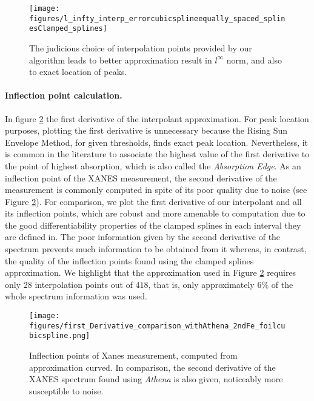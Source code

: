 \documentclass[%
 reprint,
 amsmath,amssymb,
 aps,
]{revtex4-1}
\begin{document}
\begin{figure}[htb]
 \texttt{[image: figures/l\_infty\_interp\_errorcubicsplineequally\_spaced\_splinesClamped\_splines]}
 \caption{The judicious choice of interpolation points provided by our algorithm leads to better approximation result in $l^{\infty}$ norm, and also to exact location of peaks. \label{fig:error}}
\end{figure}




\paragraph{Inflection point calculation.}\label{subsec:inflect point}
In figure \ref{fig:First_derivative} the first derivative of the interpolant approximation. For peak location purposes, plotting the first derivative is unnecessary because the Rising Sun Envelope Method, for given thresholds, finds exact peak location. Nevertheless, it is common in the literature to associate the highest value of the first derivative to the point of highest absorption, which is also called  the  \textit{Absorption Edge}.  As an  inflection point of the XANES measurement, the second derivative of the measurement is commonly  computed in spite of its poor quality due to noise (see Figure \ref{fig:First_derivative}). For comparison, we plot the first derivative of our interpolant and all its inflection points, which are robust and more amenable to computation due to the good differentiability properties of the clamped splines in each interval they are defined in. The poor information given by the second derivative of the spectrum prevents much information to be obtained from it whereas,  in contrast, the quality of the inflection points found using the clamped splines approximation. We highlight that the approximation used in Figure \ref{fig:First_derivative} requires only 28 interpolation points out of $418$, that is, only approximately  $6\%$  of the whole  spectrum information was used.


\begin{figure}[htb]
 \texttt{[image: figures/first\_Derivative\_comparison\_withAthena\_2ndFe\_foilcubicspline.png]}
 \caption{Inflection points of Xanes measurement, computed from approximation curved. In comparison, the second derivative of the XANES spectrum found using \textit{Athena}  \cite{Athena} is also given, noticeably more susceptible to noise.\label{fig:First_derivative}}
\end{figure}
\end{document}
